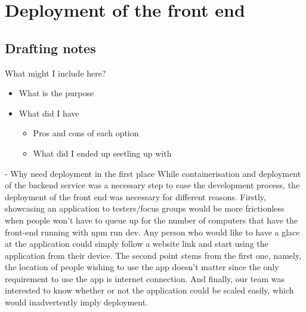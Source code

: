 \section{Deployment of the front end}
\subsection{Drafting notes}
What might I include here?
\begin{itemize}
    \item What is the purpose
    \item What did I have
    \begin{itemize}
        \item Pros and cons of each option
        \item What did I ended up seetling up with
    \end{itemize}
\end{itemize}

- Why need deployment in the first place
While containerisation and deployment of the backend service was a necessary step to ease the development process, the deployment of the front end was necessary for different reasons. Firstly, showcasing an application to testers/focus groups would be more frictionless when people won't have to queue up for the number of computers that have the front-end running with npm run dev. Any person who would like to have a glace at the application could simply follow a website link and start using the application from their device. The second point stems from the first one, namely, the location of people wishing to use the app doesn't matter since the only requirement to use the app is internet connection. And finally, our team was interested to know whether or not the application could be scaled easily, which would inadvertently imply deployment. 

